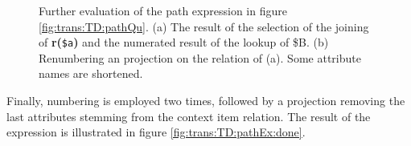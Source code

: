\begin{myExample}
\begin{figure}[h]
\quad
{}
\caption[Further evaluation of the path expression]{Further evaluation of the path expression in figure
\ref{fig:trans:TD:pathQu}. (a) The result of the selection of the joining of \textbf{r(}\texttt{\$a}\textbf{)} and
the numerated result of the lookup of \textsf{\$B}. (b) Renumbering an projection on the relation of (a). Some
attribute names are shortened.}
\end{figure}

Finally, numbering is employed two times, followed by a projection removing the last attributes stemming from the
context item relation. The result of the expression is illustrated in figure \ref{fig:trans:TD:pathEx:done}.

\end{myExample}

